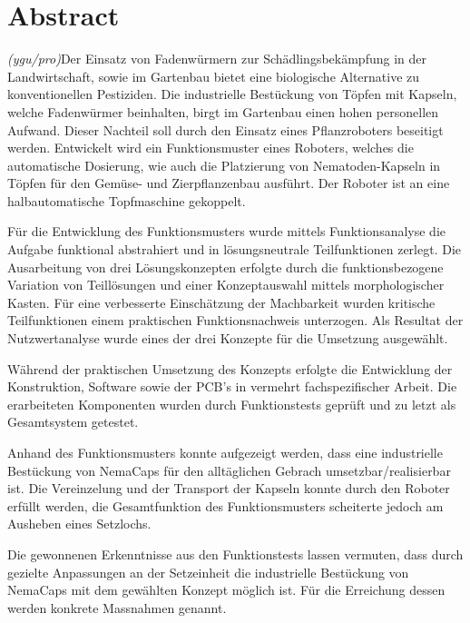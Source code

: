 \newpage
\section{Abstract}
\textit{(ygu/pro)}Der Einsatz von Fadenwürmern zur Schädlingsbekämpfung in der Landwirtschaft, sowie im Gartenbau bietet eine biologische Alternative zu konventionellen Pestiziden. Die industrielle Bestückung von Töpfen mit Kapseln, welche Fadenwürmer beinhalten, birgt im Gartenbau einen hohen personellen Aufwand. Dieser Nachteil soll durch den Einsatz eines Pflanzroboters beseitigt werden. Entwickelt wird ein Funktionsmuster eines Roboters, welches die automatische Dosierung, wie auch die Platzierung von Nematoden-Kapseln in Töpfen für den Gemüse- und Zierpflanzenbau ausführt. Der Roboter ist an eine halbautomatische Topfmaschine gekoppelt.
\newline

Für die Entwicklung des Funktionsmusters wurde mittels Funktionsanalyse die Aufgabe funktional abstrahiert und in lösungsneutrale Teilfunktionen zerlegt. Die Ausarbeitung von drei Lösungskonzepten erfolgte durch die funktionsbezogene Variation von Teillösungen und einer Konzeptauswahl mittels morphologischer Kasten. Für eine verbesserte Einschätzung der Machbarkeit wurden kritische Teilfunktionen einem praktischen Funktionsnachweis unterzogen. Als Resultat der Nutzwertanalyse wurde eines der drei Konzepte für die Umsetzung ausgewählt.
\newline

Während der praktischen Umsetzung des Konzepts erfolgte die Entwicklung der Konstruktion, Software sowie der PCB’s in vermehrt fachspezifischer Arbeit. Die erarbeiteten Komponenten wurden durch Funktionstests geprüft und zu letzt als Gesamtsystem getestet.
\newline

Anhand des Funktionsmusters konnte aufgezeigt werden, dass eine industrielle Bestückung von NemaCaps für den alltäglichen Gebrach umsetzbar/realisierbar ist.
Die Vereinzelung und der Transport der Kapseln konnte durch den Roboter erfüllt werden, die Gesamtfunktion des Funktionsmusters scheiterte jedoch am Ausheben eines Setzlochs.
\newline

Die gewonnenen Erkenntnisse aus den Funktionstests lassen vermuten, dass durch gezielte Anpassungen an der Setzeinheit die industrielle Bestückung von NemaCaps mit dem gewählten Konzept möglich ist. Für die Erreichung dessen werden konkrete Massnahmen genannt.

